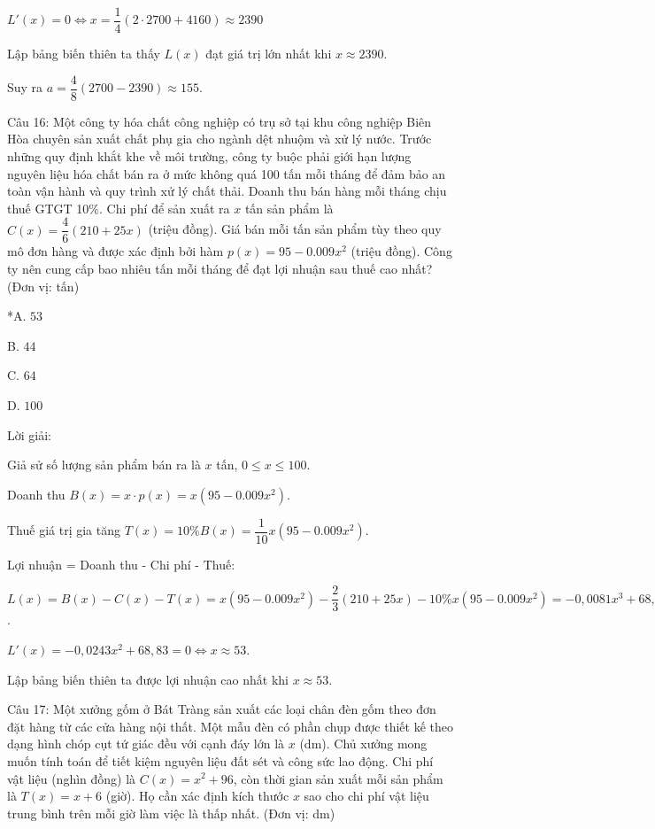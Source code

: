 \documentclass[a4paper,12pt]{article}
\begin{document}
\(L'(x) = 0 \Leftrightarrow x = \dfrac{1}{4}(2 \cdot 2700 + 4160) \approx 2390\)

Lập bảng biến thiên ta thấy \(L(x)\) đạt giá trị lớn nhất khi \(x \approx 2390\).

Suy ra \(a = \dfrac{4}{8}(2700 - 2390) \approx 155\).




Câu 16: Một công ty hóa chất công nghiệp có trụ sở tại khu công nghiệp Biên Hòa chuyên sản xuất chất phụ gia cho ngành dệt nhuộm và xử lý nước. Trước những quy định khắt khe về môi trường, công ty buộc phải giới hạn lượng nguyên liệu hóa chất bán ra ở mức không quá 100 tấn mỗi tháng để đảm bảo an toàn vận hành và quy trình xử lý chất thải. Doanh thu bán hàng mỗi tháng chịu thuế GTGT 10\%. Chi phí để sản xuất ra \(x\)  tấn sản phẩm là \(C(x) = \dfrac{4}{6}(210 + 25x)\) (triệu đồng). Giá bán mỗi tấn sản phẩm tùy theo quy mô đơn hàng và được xác định bởi hàm \(p(x) = 95 - 0.009x^2\) (triệu đồng). Công ty nên cung cấp bao nhiêu tấn mỗi tháng để đạt lợi nhuận sau thuế cao nhất? (Đơn vị: tấn)

*A. \(53\)

B. \(44\)

C. \(64\)

D. \(100\)

Lời giải:


Giả sử số lượng sản phẩm bán ra là \(x\) tấn, \(0 \leq x \leq 100\).

Doanh thu \(B(x) = x \cdot p(x) = x(95 - 0.009x^2)\).

Thuế giá trị gia tăng \(T(x) = 10\% B(x) = \dfrac{1}{10} x(95 - 0.009x^2)\).

Lợi nhuận = Doanh thu - Chi phí - Thuế:

\(L(x) = B(x) - C(x) - T(x) = x(95 - 0.009x^2) - \dfrac{2}{3}(210 + 25x) - 10\% x(95 - 0.009x^2) = -0,0081x^3 + 68,83x + -140\).

\(L'(x) = -0,0243x^2 + 68,83 = 0 \Leftrightarrow x \approx 53\).

Lập bảng biến thiên ta được lợi nhuận cao nhất khi \(x \approx 53\).




Câu 17: Một xưởng gốm ở Bát Tràng sản xuất các loại chân đèn gốm theo đơn đặt hàng từ các cửa hàng nội thất. Một mẫu đèn có phần chụp được thiết kế theo dạng hình chóp cụt tứ giác đều với cạnh đáy lớn là \(x\) (dm). Chủ xưởng mong muốn tính toán để tiết kiệm nguyên liệu đất sét và công sức lao động. Chi phí vật liệu (nghìn đồng) là \(C(x) = x^2 + 96\), còn thời gian sản xuất mỗi sản phẩm là \(T(x) = x + 6\) (giờ). Họ cần xác định kích thước \(x\) sao cho chi phí vật liệu trung bình trên mỗi giờ làm việc là thấp nhất. (Đơn vị: dm)
\end{document}
